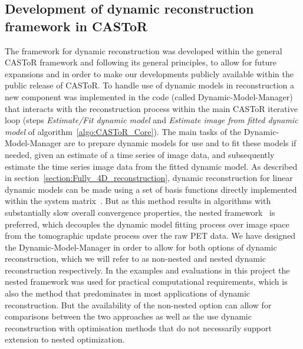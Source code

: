 \subsection{Development of dynamic reconstruction framework in CASToR}
The framework for dynamic reconstruction was developed within the general CASToR framework and following its general principles, to allow for future expansions and in order to make our developments publicly available within the public release of CASToR.
To handle use of dynamic models in reconstruction a new component was implemented in the code (called Dynamic-Model-Manager) that interacts with the reconstruction process within the main CASToR iterative loop (steps \textit{Estimate/Fit dynamic model} and \textit{Estimate image from fitted dynamic model} of algorithm~\ref{algo:CASToR_Core}). 
The main tasks of the Dynamic-Model-Manager are to prepare dynamic models for use and to fit these models if needed, given an estimate of a time series of image data, and subsequently estimate the time series image data from the fitted dynamic model. 
As described in section~\ref{section:Fully_4D_reconstruction}, dynamic reconstruction for linear dynamic models can be made using a set of basis functions directly implemented within the system matrix~\cite{Matthews1995,Wang2008,Reader2014}. But as this method results in algorithms with substantially slow overall convergence properties, the nested framework~\cite{Wang2010,Matthews2010} is preferred, which decouples the dynamic model fitting process over image space from the tomographic update process over the raw PET data.
We have designed the Dynamic-Model-Manager in order to allow for both options of dynamic reconstruction, which we will refer to as non-nested and nested dynamic reconstruction respectively.
In the examples and evaluations in this project the nested framework was used for practical computational requirements, which is also the method that predominates in most applications of dynamic reconstruction. But the availability of the non-nested option can allow for comparisons between the two approaches as well as the use dynamic reconstruction with optimisation methods that do not necessarily support extension to nested optimization. 

